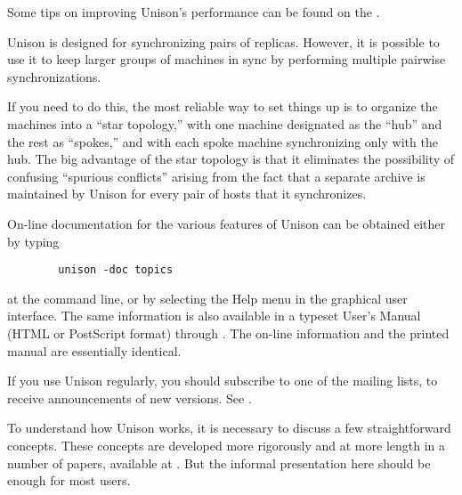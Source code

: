 \documentclass{article}
\begin{document}
Some tips on improving Unison's performance can be found on the
.


Unison is designed for synchronizing pairs of replicas.  However, it is
possible to use it to keep larger groups of machines in sync by performing
multiple pairwise synchronizations.  

If you need to do this, the most reliable way to set things up is to
organize the machines into a ``star topology,'' with one machine designated
as the ``hub'' and the rest as ``spokes,'' and with each spoke machine
synchronizing only with the hub.  The big advantage of the star topology is
that it eliminates the possibility of confusing ``spurious conflicts''
arising from the fact that a separate archive is maintained by Unison for
every pair of hosts that it synchronizes.



On-line documentation for the various features of Unison
can be obtained either by typing
\begin{verbatim}
        unison -doc topics
\end{verbatim}
\noindent
at the command line, or by selecting the Help menu in the graphical
user interface.  
\iftextversion
The same information is also available in a typeset User's
Manual (HTML or PostScript format) through
. 
\else
The on-line information and the printed manual are essentially identical.
\fi

If you use Unison regularly, you should subscribe to one of the mailing
lists, to receive announcements of new versions.  See
. 


To understand how Unison works, it is necessary to discuss a few
straightforward concepts.
%
These concepts are developed more rigorously and at more length in a number
of papers, available at .
But the informal presentation here should be enough for most users.


\end{document}
